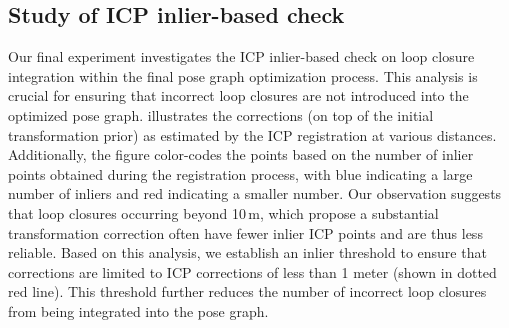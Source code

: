 

\subsection{Study of ICP inlier-based check}
\label{sec:exp_icp_ablation}

Our final experiment investigates the ICP inlier-based check on loop closure integration within the final pose graph optimization process. This analysis is crucial for ensuring that incorrect loop closures are not introduced into the optimized pose graph.
 illustrates the corrections (on top of the initial transformation prior) as estimated by the ICP registration at various distances. Additionally, the figure color-codes the points based on the number of inlier points obtained during the registration process, with blue indicating a large number of inliers and red indicating a smaller number.
Our observation suggests that loop closures occurring beyond 10\,m, which propose a substantial transformation correction often have fewer inlier ICP points and are thus less reliable.
Based on this analysis, we establish an inlier threshold to ensure that corrections are limited to ICP corrections of less than 1 meter (shown in dotted red line). This threshold further reduces the number of incorrect loop closures from being integrated into the pose graph.



